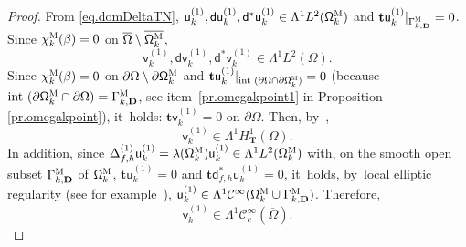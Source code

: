 \documentclass[JEP,XML,SOM,Unicode,NoEqCountersInSection,NoFloatCountersInSection,published]{cedram}
\newcommand{\ft}[1]{\mathsf{#1}}
\newcommand{\mbf}[1]{\mathbf{#1}}
\let\pa\partial
\theoremstyle{plain}
\theoremstyle{definition}
\begin{document}
\begin{proof}
From \eqref{eq.domDeltaTN}, $\mathsf u_k^{(1)}, \mathsf d \mathsf u_k^{(1)}, \mathsf d^* \mathsf u_k^{(1)}\in \Lambda^1L^{2}(\mathsf \Omega^{\textsc{M}}_k)$ and $\mathbf{t}\ft u_k^{(1)}|_{\Gamma^{\textsc{M}}_{k,\mbf D}}=0$. Since $ \chi_k^{\textsc{M}} (\beta)=0$ on $\overline{\Omega}\setminus \overline{ \mathsf \Omega_k^{\textsc{M}}}$,
\[
\text{$\mathsf v_k^{(1)}, \mathsf d \mathsf v_k^{(1)}, \mathsf d^* \mathsf v_k^{(1)}\in \Lambda^1L^{2}(\Omega)$}.
\]
Since $ \chi_k^{\textsc{M}} (\beta)=0$ on $\partial {\Omega}\setminus \pa{ \mathsf \Omega_k^{\textsc{M}}}$ and $\mathbf{t}\ft u_k^{(1)}|_{\text{int } (\partial {\Omega}\cap \pa{ \mathsf \Omega_k^{\textsc{M}}})}=0$ (because $\text{int }(\pa \mathsf \Omega_k^{\textsc{M}} \cap \partial \Omega)= {\Gamma_{k,\mbf D}^{\textsc{M}}}$, see item~\eqref{pr.omegakpoint1} in Proposition \ref{pr.omegakpoint}), it~holds: $\mathbf{t}\ft v_k^{(1)}=0$ on $\partial \Omega$.
Then, by~\cite[Lem.\,73]{DLLN},
\[
\mathsf v_k^{(1)}\in \Lambda^1H^1_{\mbf T}(\Omega).
\]
In addition, since $\Delta^{(1)}_{f,h}\mathsf u_k^{(1)}= \lambda(\mathsf \Omega_k^{\textsc{M}}) \mathsf u_k^{(1)} \in \Lambda^1L^2 (\mathsf \Omega_{k}^{\textsc{M}})$ with, on the smooth open subset $\Gamma_{k,\mbf D}^{\textsc{M}}$ of $\mathsf \Omega_{k}^{\textsc{M}}$,
$\mathbf{t}\ft u_k^{(1)}=0$ and $\mathbf{t} \mathsf d_{f,h}^*\ft u_k^{(1)}=0$, it~holds, by~local elliptic regularity (see for example~\cite{ChPi}), $\mathsf u_k^{(1)}\in\Lambda^1\mathcal C^\infty (\mathsf \Omega_{k}^{\textsc{M}} \cup \Gamma_{k,\mbf D}^{\textsc{M}})$. Therefore,
\[
\mathsf v_k^{(1)}\in\Lambda^1\mathcal C^\infty_c (\overline \Omega).
\]


\end{proof}
\end{document}
